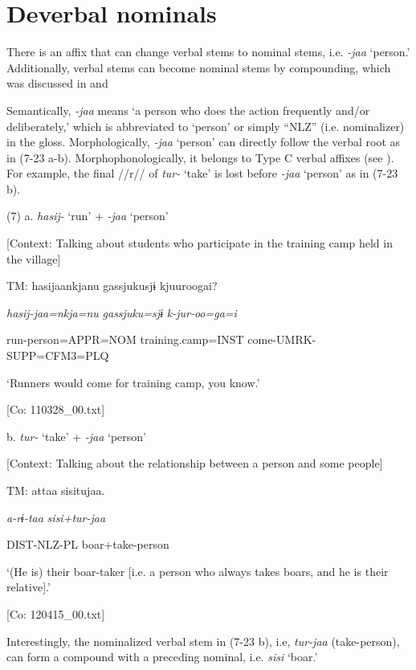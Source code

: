 \section{Deverbal nominals}

There is an affix that can change verbal stems to nominal stems, i.e. \textit{{}-jaa} ‘person.’ Additionally, verbal stems can become nominal stems by compounding, which was discussed in  and 

Semantically, \textit{{}-jaa} means ‘a person who does the action frequently and/or deliberately,’ which is abbreviated to ‘person’ or simply “NLZ” (i.e. nominalizer) in the gloss. Morphologically, \textit{-jaa} ‘person’ can directly follow the verbal root as in (7-23 a-b). Morphophonologically, it belongs to Type C verbal affixes (see ). For example, the final //r// of \textit{tur-} ‘take’ is lost before \textit{{}-jaa} ‘person’ as in (7-23 b).

(7)  a.  \textit{hasij-} ‘run’ + \textit{{}-jaa} ‘person’

    [Context: Talking about students who participate in the training camp held in the village]

    TM:  hasijaankjanu  {\textbar}gassjuku{\textbar}sjɨ  kjuuroogai?

      \textit{hasij-jaa=nkja=nu}  \textit{gassjuku=sjɨ}  \textit{k-jur-oo=ga=i}

      run-person=APPR=NOM  training.camp=INST  come-UMRK-SUPP=CFM3=PLQ

      ‘Runners would come for training camp, you know.’

    [Co: 110328\_00.txt]

  b.  \textit{tur-} ‘take’ + \textit{{}-jaa} ‘person’

    [Context: Talking about the relationship between a person and some people]

    TM:  attaa   sisitujaa.

      \textit{a-rɨ-taa}  \textit{sisi+tur-jaa}

      DIST-NLZ-PL  boar+take-person

      ‘(He is) their boar-taker [i.e. a person who always takes boars, and he is their relative].’

    [Co: 120415\_00.txt]

Interestingly, the nominalized verbal stem in (7-23 b), i.e, \textit{tur-jaa} (take-person), can form a compound with a preceding nominal, i.e. \textit{sisi} ‘boar.’


